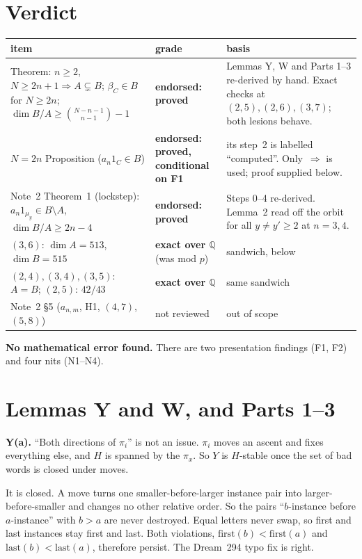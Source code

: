 \documentclass[11pt]{article}
\begin{document}
\section*{Verdict}
\begin{center}\small
\begin{tabular}{@{}p{5.2cm}p{3.1cm}p{8.0cm}@{}}
\toprule
item & grade & basis\\\midrule
Theorem: $n\ge2$, $N\ge 2n+1\Rightarrow A\subsetneq B$; $\beta_C\in B$ for $N\ge2n$; $\dim B/A\ge\binom{N-n-1}{n-1}-1$ &
\textbf{endorsed: proved} & Lemmas Y, W and Parts 1--3 re-derived by hand. Exact checks at $(2,5),(2,6),(3,7)$; both lesions behave. \\
$N=2n$ Proposition ($a_n1_C\in B$) & \textbf{endorsed: proved, conditional on F1} & its step~2 is labelled ``computed''. Only~$\Rightarrow$ is used; proof supplied below. \\
Note~2 Theorem~1 (lockstep): $a_n1_{\mu_y}\in B\setminus A$, $\dim B/A\ge2n-4$ & \textbf{endorsed: proved} & Steps 0--4 re-derived. Lemma~2 read off the orbit for all $y\ne y'\ge2$ at $n=3,4$. \\
$(3,6)$: $\dim A=513$, $\dim B=515$ & \textbf{exact over $\mathbb Q$} (was mod $p$) & sandwich, below \\
$(2,4),(3,4),(3,5)$: $A=B$; $(2,5)$: $42/43$ & \textbf{exact over $\mathbb Q$} & same sandwich\\
Note~2 \S5 ($a_{n,m}$, H1, $(4,7)$, $(5,8)$) & not reviewed & out of scope\\
\bottomrule
\end{tabular}
\end{center}
\textbf{No mathematical error found.} There are two presentation findings (F1, F2) and four nits (N1--N4).

\section{Lemmas Y and W, and Parts 1--3}
\textbf{Y(a).} ``Both directions of $\pi_i$'' is not an issue. $\pi_i$ moves an ascent and fixes everything else, and $H$ is spanned by the $\pi_x$. So $Y$ is $H$-stable once the set of bad words is closed under moves.

It is closed. A move turns one smaller-before-larger instance pair into larger-before-smaller and changes no other relative order. So the pairs ``$b$-instance before $a$-instance'' with $b>a$ are never destroyed. Equal letters never swap, so first and last instances stay first and last. Both violations, $\mathrm{first}(b)<\mathrm{first}(a)$ and $\mathrm{last}(b)<\mathrm{last}(a)$, therefore persist. The Dream~294 typo fix is right.
\end{document}
